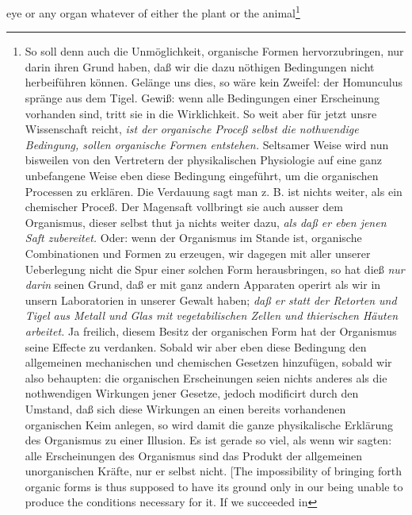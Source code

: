 \documentclass[12pt,a4paper]{book}
\begin{document}
eye or any organ whatever of either the plant or the
animal\footnote{So soll denn auch die Unmöglichkeit, organische
Formen hervorzubringen, nur darin ihren Grund haben, daß wir die
dazu nöthigen Bedingungen nicht herbeiführen können. Gelänge uns
dies, so wäre kein Zweifel: der Homunculus spränge aus dem Tigel.
Gewiß: wenn alle Bedingungen einer Erscheinung vorhanden sind,
tritt sie in die Wirklichkeit. So weit aber für jetzt unsre
Wissenschaft reicht, \emph{ist der organische Proceß selbst die
nothwendige Bedingung, sollen organische Formen entstehen.}
Seltsamer Weise wird nun bisweilen von den Vertretern der
physikalischen Physiologie auf eine ganz unbefangene Weise eben
diese Bedingung eingeführt, um die organischen Processen zu
erklären. Die Verdauung sagt man z. B. ist nichts weiter, als ein
chemischer Proceß. Der Magensaft vollbringt sie auch ausser dem
Organismus, dieser selbst thut ja nichts weiter dazu, \emph{als daß er
eben jenen Saft zubereitet.} Oder: wenn der Organismus im Stande
ist, organische Combinationen und Formen zu erzeugen, wir dagegen
mit aller unserer Ueberlegung nicht die Spur einer solchen Form
herausbringen, so hat dieß \emph{nur darin} seinen Grund, daß er mit ganz
andern Apparaten operirt als wir in unsern Laboratorien
in unserer Gewalt haben; \emph{daß er statt der Retorten und Tigel aus Metall
und Glas mit vegetabilischen Zellen und thierischen Häuten arbeitet.} Ja
freilich, diesem Besitz der organischen Form hat der Organismus seine
Effecte zu verdanken. Sobald wir aber eben diese Bedingung den
allgemeinen mechanischen und chemischen Gesetzen hinzufügen, sobald wir
also behaupten: die organischen Erscheinungen seien nichts anderes als
die nothwendigen Wirkungen jener Gesetze, jedoch modificirt durch den
Umstand, daß sich diese Wirkungen an einen bereits vorhandenen
organischen Keim anlegen, so wird damit die ganze physikalische
Erklärung des Organismus zu einer Illusion. Es ist gerade so viel, als
wenn wir sagten: alle Erscheinungen des Organismus sind das Produkt der
allgemeinen unorganischen Kräfte, nur er selbst nicht. [The impossibility of
bringing forth organic forms is thus supposed to have its ground only in our
being unable to produce the conditions necessary for it. If we succeeded in
}
\end{document}
